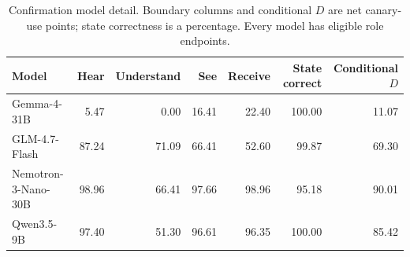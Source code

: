 \documentclass[11pt]{article}
\begin{document}
\begin{table}[t]
\centering\small
\begin{lrbox}{\OCtable}\begin{tabular}{@{}lrrrrrr@{}}
\toprule
Model & Hear & Understand & See & Receive & State correct & Conditional $D$\\
\midrule
Gemma-4-31B & 5.47 & 0.00 & 16.41 & 22.40 & 100.00 & 11.07\\
GLM-4.7-Flash & 87.24 & 71.09 & 66.41 & 52.60 & 99.87 & 69.30\\
Nemotron-3-Nano-30B & 98.96 & 66.41 & 97.66 & 98.96 & 95.18 & 90.01\\
Qwen3.5-9B & 97.40 & 51.30 & 96.61 & 96.35 & 100.00 & 85.42\\
\bottomrule
\end{tabular}\end{lrbox}
\ifdim\wd\OCtable>\linewidth\PackageError{access-paper}{Table tab:modeldetail exceeds its column}{Revise the table layout.}\fi
\usebox{\OCtable}
\caption{Confirmation model detail. Boundary columns and conditional $D$ are net canary-use points; state correctness is a percentage. Every model has eligible role endpoints.}
\label{tab:modeldetail}
\end{table}
\end{document}

